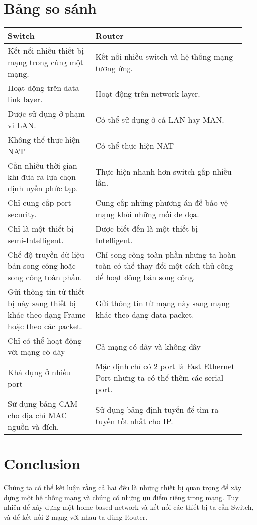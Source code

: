 \documentclass[12pt]{article}
\begin{document}
    \section*{Bảng so sánh}
    \begin{center}
        \begin{tabular}{ p{0.35\linewidth} | p{0.6\linewidth}}
        \hline
        Switch & Router  \\ \hline
        Kết nối nhiều thiết bị mạng trong cùng một mạng. & Kết nối nhiều switch và hệ thống 
        mạng tương ứng. \\ \hline
        Hoạt động trên data link layer. & Hoạt động trên network layer. \\ \hline
        Được sử dụng ở phạm vi LAN. & Có thể sử dụng ở cả LAN hay MAN. \\ \hline
        Không thể thực hiện NAT & Có thể thực hiện NAT \\ \hline
        Cần nhiều thời gian khi đưa ra lựa chọn định  uyến phức tạp. & Thực hiện nhanh hơn switch gấp nhiều lần. \\ \hline
        Chỉ cung cấp port security. & Cung cấp những phương án để bảo vệ mạng khỏi những 
        mối đe dọa. \\ \hline
        Chỉ là một thiết bị semi-Intelligent. & Được biết đến là một thiết bị Intelligent. \\
        \hline
        Chế độ truyền dữ liệu bán song công hoặc song công toàn phần. & Chỉ song công toàn phần nhưng ta hoàn toàn có thể thay đổi một cách 
        thủ công để hoạt đông bán song công. \\ \hline
        Gửi thông tin từ thiết bị này sang thiết bị khác theo dạng Frame hoặc theo
        các packet. & Gửi thông tin từ mạng này sang mạng khác theo dạng data packet. \\ \hline
        Chỉ có thể hoạt động với mạng có dây & Cả mạng có dây và không dây \\ \hline
        Khả dụng ở nhiều port & Mặc định chỉ có 2 port là Fast Ethernet Port nhưng ta có thể thêm các serial port. \\ \hline
        Sử dụng bảng CAM cho địa chỉ MAC nguồn và đích. & Sử dụng bảng định tuyến để tìm ra tuyến tốt nhất cho IP.
        \end{tabular}
    \end{center}

    \section*{Conclusion}
    Chúng ta có thể kết luận rằng cả hai đều là những thiết bị quan trọng
    để xây dựng một hệ thống mạng và chúng có những ưu điểm riêng trong mạng. Tuy nhiên để
    xây dựng một home-based network và kết nối các thiết bị ta cần Switch, và để kết nối 2 mạng với nhau
    ta dùng Router.
    
\end{document}
